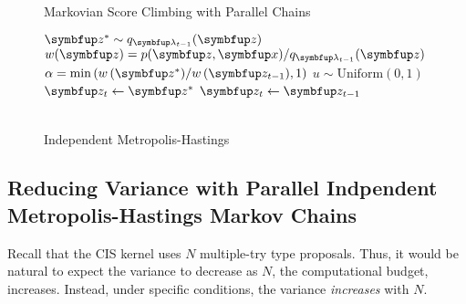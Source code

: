 \begin{figure}
  \centering
\begin{minipage}[t]{0.45\textwidth}
  \begin{algorithm2e}[H]
    \DontPrintSemicolon
    \SetAlgoLined
    \caption{Markovian Score Climbing with Parallel Chains}\label{alg:pimh}
  \end{algorithm2e}
\end{minipage}
\hspace{0.2in}
\begin{minipage}[t]{0.39\textwidth}
  \begin{algorithm2e}[H]
    \DontPrintSemicolon
    \SetAlgoLined
    \(\vz^* \sim q_{\vlambda_{t-1}}(\vz)\)\;
    \(w(\vz) = p(\vz,\vx)/q_{\vlambda_{t-1}}(\vz) \)\;
    \(\alpha = \min\left( w\,(\vz^*)/w\,(\vz_{t-1}), 1\right)\)\;
    \(u \sim \mathrm{Uniform}(0, 1) \)\;
        {
          \(\vz_t \leftarrow \vz^*\)
        }
        {
          \(\vz_t \leftarrow \vz_{t-1}\)
        }
        \caption{\\ Independent Metropolis-Hastings}\label{alg:pimh}
  \end{algorithm2e}
\end{minipage}
\end{figure}
%
\subsection{Reducing Variance with Parallel Indpendent Metropolis-Hastings Markov Chains}\label{section:cis_bias}
Recall that the CIS kernel uses \(N\) multiple-try type proposals.
Thus, it would be natural to expect the variance to decrease as \(N\), the computational budget, increases.
Instead, under specific conditions, the variance \textit{increases} with \(N\).

